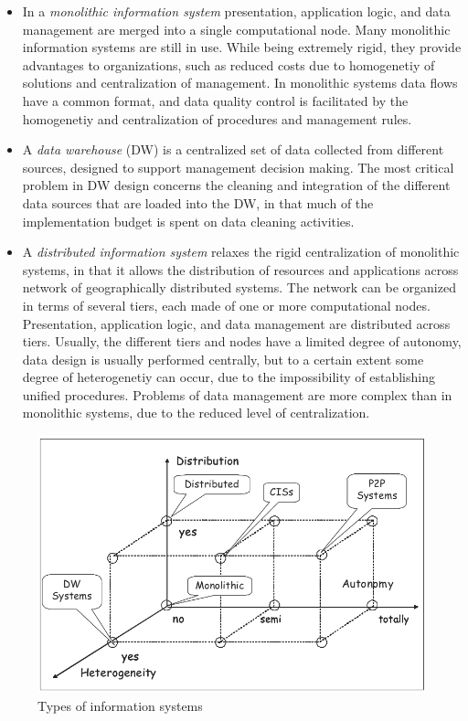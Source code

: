 \begin{itemize}
    \item{In a \textit{monolithic information system} presentation, application logic, and data management are merged into a single computational node.
    Many monolithic information systems are still in use. While being extremely rigid, they provide advantages to organizations, such as reduced costs due to homogenetiy of solutions and centralization of management.
    In monolithic systems data flows have a common format, and data quality control is facilitated by the homogenetiy and centralization of procedures and management rules.}
    \item {A \textit{data warehouse} (DW) is a centralized set of data collected from different sources, designed to support management decision making. The most critical problem in DW design concerns the cleaning and integration of 
    the different data sources that are loaded into the DW, in that much of the implementation budget is spent on data cleaning activities.}
    \item{A \textit{distributed information system} relaxes the rigid centralization of monolithic systems, in that it allows the distribution of resources and applications across
    network of geographically distributed systems.
    The network can be organized in terms of several tiers, each made of one or more computational nodes. Presentation, application logic, and data management are distributed across tiers. Usually, the different tiers and nodes have a limited degree of autonomy, 
    data design is usually performed centrally, but to a certain extent some degree of heterogenetiy can occur, due to the impossibility of establishing unified procedures.
    Problems of data management are more complex than in monolithic systems, due to the reduced level of centralization.
    }  
\end{itemize}

\begin{figure}[H]
\centering
\includegraphics[scale=.50]{types-of-information-systems}
\caption{Types of information systems}    
\end{figure}

